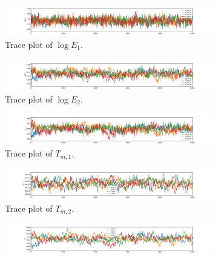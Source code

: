 \begin{figure}[h!]
\centering
\begin{subfigure}{\textwidth}
  \centering
  \includegraphics[width=\linewidth]{figures/bayesian/EXP_Q/trace_plot_E1_burned.pdf} 
  \caption{Trace plot of $\log E_1$.}
  \label{fig:subtpburnE1}
\end{subfigure}%
\newline
\begin{subfigure}{\textwidth}
  \centering
  \includegraphics[width=\linewidth]{figures/bayesian/EXP_Q/trace_plot_E2_burned.pdf}
  \caption{Trace plot of $\log E_2$.}
  \label{fig:subtpburnE2}
\end{subfigure}
\newline
\begin{subfigure}{\textwidth}
  \centering
  \includegraphics[width=\linewidth]{figures/bayesian/EXP_Q/trace_plot_Tm1_burned.pdf}
  \caption{Trace plot of $T_{m,1}$.}
  \label{fig:subtpburnTm1}
\end{subfigure}%
\newline
\begin{subfigure}{\textwidth}
  \centering
  \includegraphics[width=\linewidth]{figures/bayesian/EXP_Q/trace_plot_Tm2_burned.pdf}
  \caption{Trace plot of $T_{m,2}$.}
  \label{fig:subtpburnTm2}
\end{subfigure}
\newline
\begin{subfigure}{\textwidth}
  \centering
  \includegraphics[width=\linewidth]{figures/bayesian/EXP_Q/trace_plot_Q1_burned.pdf}

\end{subfigure}
\end{figure}
